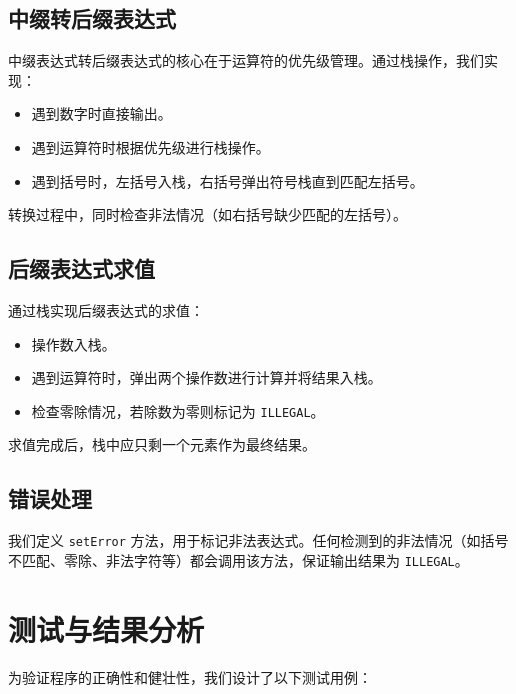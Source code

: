 \documentclass[UTF8]{ctexart}
\begin{document}
\subsection{中缀转后缀表达式}
中缀表达式转后缀表达式的核心在于运算符的优先级管理。通过栈操作，我们实现：
\begin{itemize}
    \item 遇到数字时直接输出。
    \item 遇到运算符时根据优先级进行栈操作。
    \item 遇到括号时，左括号入栈，右括号弹出符号栈直到匹配左括号。
\end{itemize}
转换过程中，同时检查非法情况（如右括号缺少匹配的左括号）。

\subsection{后缀表达式求值}
通过栈实现后缀表达式的求值：
\begin{itemize}
    \item 操作数入栈。
    \item 遇到运算符时，弹出两个操作数进行计算并将结果入栈。
    \item 检查零除情况，若除数为零则标记为 \texttt{ILLEGAL}。
\end{itemize}
求值完成后，栈中应只剩一个元素作为最终结果。

\subsection{错误处理}
我们定义 \texttt{setError} 方法，用于标记非法表达式。任何检测到的非法情况（如括号不匹配、零除、非法字符等）都会调用该方法，保证输出结果为 \texttt{ILLEGAL}。

\section{测试与结果分析}
为验证程序的正确性和健壮性，我们设计了以下测试用例：
\end{document}
